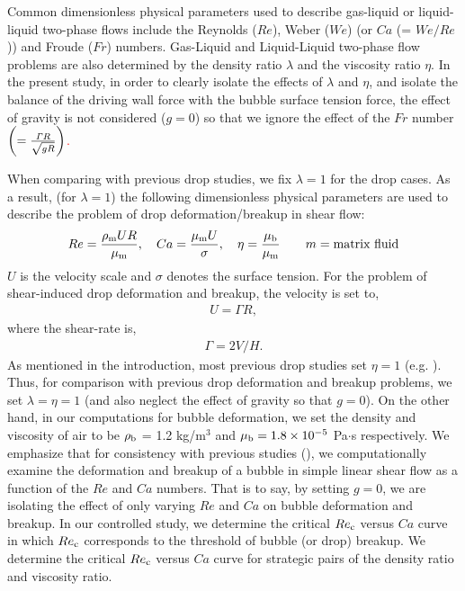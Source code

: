 \documentclass{elsarticle}
\begin{document}
Common dimensionless physical parameters used to describe gas-liquid or
liquid-liquid two-phase flows include the Reynolds ($Re$), Weber ($We$) (or
$Ca$ (= $We/Re$)) and Froude ($Fr$) numbers.  Gas-Liquid and Liquid-Liquid
two-phase flow problems are also determined by the density ratio $\lambda$ and
the viscosity ratio $\eta$.  In the present study, in order to clearly isolate the effects of $\lambda$ and $\eta$, and isolate the balance of the driving wall force with the bubble surface tension force, the effect of gravity is not considered ($g = 0$) so that we ignore the effect of the $Fr$ number 
\textcolor{red}
{
$\left(= \frac{{\it \Gamma}R}{\sqrt {gR}} \right)$.
}

When comparing with previous drop studies, we fix $\lambda=1$ for the drop cases.  As a result, (for $\lambda=1$) the following dimensionless physical parameters are used to describe the problem of drop deformation/breakup in shear flow:
%
\begin{eqnarray}\label{dimensonless}
  Re = \frac{\rho_{\rm m}UR}{\mu_{\rm m}}, \quad
  Ca = \frac{\mu_{\rm m}U}{\sigma}, \quad
  \eta = \frac{\mu_{\rm b}}{\mu_{\rm m}} 
	\hspace{20pt} m=\mbox{matrix fluid}
\end{eqnarray}
%
$U$ is the velocity scale and $\sigma$ denotes the surface tension.  For the problem of shear-induced drop deformation and breakup, the velocity is set to,
\begin{eqnarray*}
U = \mathit{\Gamma} R, 
\end{eqnarray*}
where the shear-rate is,
\begin{eqnarray*}
\Gamma = 2V/H.  
\end{eqnarray*}
As mentioned in the introduction, most previous drop studies set $\eta = 1$ (e.g.  \citet{LiRenRen00}).  Thus, for comparison with previous drop deformation and breakup problems, we set $\lambda = \eta = 1$ (and also neglect the effect of gravity so that $g=0$). On the other hand, in our computations for bubble deformation, we set the density and viscosity of air to be $\rho_{\rm b}$ = 1.2 kg/m$^{3}$ and $\mu_{\rm b} = 1.8 \times 10^{-5}$ Pa$\cdot$s respectively.  We emphasize that for consistency with previous studies (\citet{LiRenRen00, RusMan02, MulTobDreFisWin08, KomShaEskDer14, AmaBalCasOli19}), we computationally examine the deformation and breakup of a bubble in simple linear shear flow as a function of the $Re$ and $Ca$ numbers.  That is to say, by setting $g=0$, we are isolating the effect of only varying $Re$ and $Ca$ on bubble deformation and breakup.  In our controlled study, we determine the critical $Re_{\rm c}$ versus $Ca$ curve in which $Re_{\rm c}$ corresponds to the threshold of bubble (or drop) breakup.  We determine the critical $Re_{\rm c}$ versus $Ca$ curve for strategic pairs of the density ratio and viscosity ratio.
\end{document}
